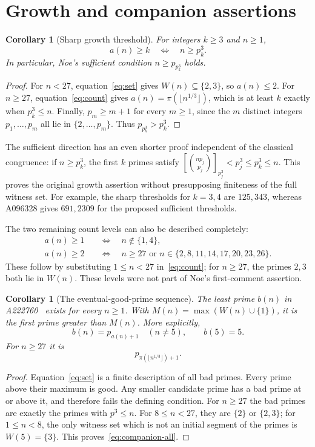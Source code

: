 \documentclass[11pt]{article}
\newtheorem{corollary}[theorem]{Corollary}
\newcommand{\binrem}[3]{\left[\binom{#1#2}{#2}\right]_{#2^{#3}}}
\begin{document}
\section{Growth and companion assertions}
\begin{corollary}[Sharp growth threshold]\label{cor:growth}
For integers $k\ge3$ and $n\ge1$,
\[
 a(n)\ge k\quad\Longleftrightarrow\quad n\ge p_k^3.
\]
In particular, Noe's sufficient condition $n\ge p_{p_k^3}$ holds.
\end{corollary}
\begin{proof}
For $n<27$, equation~\eqref{eq:set} gives $W(n)\subseteq\{2,3\}$, so
$a(n)\le2$. For $n\ge27$, equation~\eqref{eq:count} gives
$a(n)=\pi(\lfloor n^{1/3}\rfloor)$, which is at least $k$ exactly when
$p_k^3\le n$. Finally, $p_m\ge m+1$ for every $m\ge1$, since the $m$
distinct integers $p_1,\ldots,p_m$ all lie in $\{2,\ldots,p_m\}$.
Thus $p_{p_k^3}>p_k^3$.
\end{proof}

The sufficient direction has an even shorter proof independent of the
classical congruence: if $n\ge p_k^3$, the first $k$ primes satisfy
$\binrem{n}{p_j}{3}<p_j^3\le p_k^3\le n$. This proves the original growth
assertion without presupposing finiteness of the full witness set.
For example, the sharp thresholds for $k=3,4$ are $125,343$, whereas
A096328 gives $691,2309$ for the proposed sufficient thresholds.

The two remaining count levels can also be described completely:
\begin{equation}\label{eq:small-levels}
\begin{split}
 a(n)\ge1&\quad\Longleftrightarrow\quad n\notin\{1,4\},\\
 a(n)\ge2&\quad\Longleftrightarrow\quad n\ge27
 \text{ or }n\in\{2,8,11,14,17,20,23,26\}.
\end{split}
\end{equation}
These follow by substituting $1\le n<27$ in~\eqref{eq:count}; for
$n\ge27$, the primes $2,3$ both lie in $W(n)$. These levels were not
part of Noe's first-comment assertion.

\begin{corollary}[The eventual-good-prime sequence]\label{cor:companion}
The least prime $b(n)$ in A222760~\cite{companion} exists for every
$n\ge1$. With $M(n)=\max(W(n)\cup\{1\})$, it is the first prime greater
than $M(n)$. More explicitly,
\begin{equation}\label{eq:companion-all}
 b(n)=p_{a(n)+1}\quad(n\ne5),\qquad b(5)=5.
\end{equation}
For $n\ge27$ it is
\[
 p_{\pi(\lfloor n^{1/3}\rfloor)+1}.
\]
\end{corollary}
\begin{proof}
Equation~\eqref{eq:set} is a finite description of all bad primes. Every
prime above their maximum is good. Any smaller candidate prime has a bad
prime at or above it, and therefore fails the defining condition.
For $n\ge27$ the bad primes are exactly the primes with $p^3\le n$.
For $8\le n<27$, they are $\{2\}$ or $\{2,3\}$; for $1\le n<8$,
the only witness set which is not an initial segment of the primes is
$W(5)=\{3\}$. This proves~\eqref{eq:companion-all}.
\end{proof}
\end{document}
